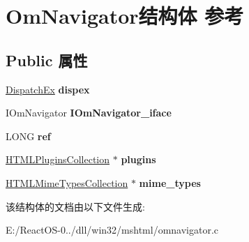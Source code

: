 \hypertarget{struct_om_navigator}{}\section{Om\+Navigator结构体 参考}
\label{struct_om_navigator}
\subsection*{Public 属性}
\begin{DoxyCompactItemize}
\item 
\mbox{\label{struct_om_navigator_adedb74662bf6b2a0020d43b66d9f540f}} 
\hyperlink{struct_dispatch_ex}{Dispatch\+Ex} {\bfseries dispex}
\item 
\mbox{\label{struct_om_navigator_a38896ac37f115e9b8bb65fefc89ee21b}} 
I\+Om\+Navigator {\bfseries I\+Om\+Navigator\+\_\+iface}
\item 
\mbox{\label{struct_om_navigator_aa7e6e62e6e9938060a8eeb9fca3c42ed}} 
L\+O\+NG {\bfseries ref}
\item 
\mbox{\label{struct_om_navigator_a49e89e5ad22f5e1e75803178c16254e7}} 
\hyperlink{struct_h_t_m_l_plugins_collection}{H\+T\+M\+L\+Plugins\+Collection} $\ast$ {\bfseries plugins}
\item 
\mbox{\label{struct_om_navigator_aff767a430297245cbcf7909e876c424c}} 
\hyperlink{struct_h_t_m_l_mime_types_collection}{H\+T\+M\+L\+Mime\+Types\+Collection} $\ast$ {\bfseries mime\+\_\+types}
\end{DoxyCompactItemize}


该结构体的文档由以下文件生成\+:\begin{DoxyCompactItemize}
\item 
E\+:/\+React\+O\+S-\/0../dll/win32/mshtml/omnavigator.\+c\end{DoxyCompactItemize}
